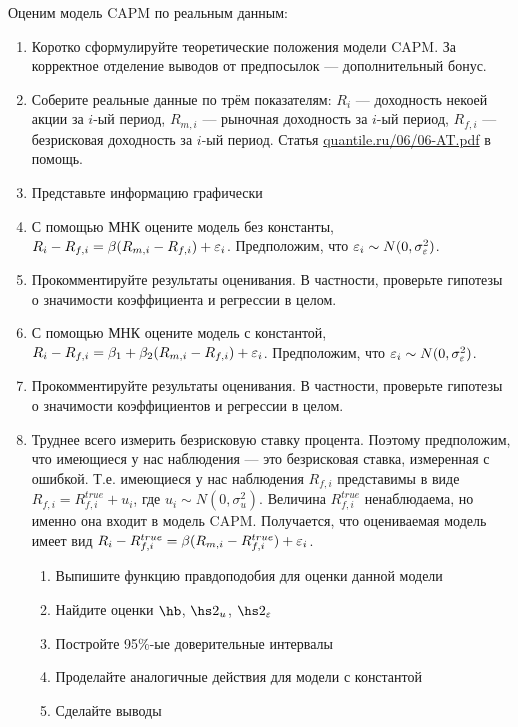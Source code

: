 \documentclass[12pt, a4paper]{article}
\theoremstyle{definition}
\begin{document}
Оценим модель CAPM по реальным данным:
\begin{enumerate}
\item Коротко сформулируйте теоретические положения модели CAPM. За корректное отделение выводов от предпосылок — дополнительный бонус.
\item Соберите реальные данные по трём показателям: $R_i$ — доходность некоей акции за $i$-ый период, $R_{m,i}$ — рыночная доходность за $i$-ый период, $R_{f,i}$ — безрисковая доходность за $i$-ый период. Статья \href{http://quantile.ru/06/06-AT.pdf}{quantile.ru/06/06-AT.pdf} в помощь.
\item Представьте информацию графически
\item С помощью МНК оцените модель без константы, $R_i-R_{f,i}=\beta (R_{m,i}-R_{f,i})+\varepsilon_i$. Предположим, что $\varepsilon_i \sim N(0,\sigma_{\varepsilon}^2)$.
\item Прокомментируйте результаты оценивания. В частности, проверьте гипотезы о значимости коэффициента и регрессии в целом.
\item С помощью МНК оцените модель с константой, $R_i-R_{f,i}=\beta_1 + \beta_2 (R_{m,i}-R_{f,i})+\varepsilon_i$. Предположим, что $\varepsilon_i \sim N(0,\sigma_{\varepsilon}^2)$.
\item Прокомментируйте результаты оценивания. В частности, проверьте гипотезы о значимости коэффициентов и регрессии в целом.
\item Труднее всего измерить безрисковую ставку процента. Поэтому предположим, что имеющиеся у нас наблюдения — это безрисковая ставка, измеренная с ошибкой. Т.е. имеющиеся у нас наблюдения $R_{f,i}$ представимы в виде $R_{f,i}=R_{f,i}^{true}+u_i$, где $u_i \sim N(0,\sigma^2_u)$. Величина $R_{f,i}^{true}$ ненаблюдаема, но именно она входит в модель CAPM. Получается, что оцениваемая модель имеет вид $R_i-R_{f,i}^{true}=\beta (R_{m,i}-R_{f,i}^{true})+\varepsilon_i$.
\begin{enumerate}
\item Выпишите функцию правдоподобия для оценки данной модели
\item Найдите оценки $\hb$, $\hs2_{u}$, $\hs2_{\e}$
\item Постройте 95\%-ые доверительные интервалы
\item Проделайте аналогичные действия для модели с константой
\item Сделайте выводы
\end{enumerate}

\end{enumerate}
\end{document}
